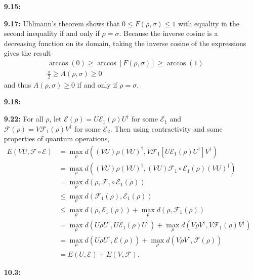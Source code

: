 \documentclass[a4paper,12pt]{article}
\begin{document}
\begin{enumerate}
    \item[\textbf{9.15:}]

    \item[\textbf{9.17:}]
        Uhlmann's theorem shows that $0 \leq F(\rho, \sigma) \leq 1$ with equality in the second inequality if and only if $\rho = \sigma$. Because the inverse cosine is a decreasing function on its domain, taking the inverse cosine of the expressions gives the result
        \begin{gather*}
            \arccos(0) \geq \arccos[F(\rho, \sigma)] \geq \arccos(1) \\
            \frac{\pi}{2} \geq A(\rho, \sigma) \geq 0
        \end{gather*}
        and thus $A(\rho, \sigma) \geq 0$ if and only if $\rho = \sigma$.


    \item[\textbf{9.18:}]

    \item[\textbf{9.22:}]
        For all $\rho$, let $\mathcal{E}(\rho) = U \mathcal{E}_1(\rho) U^\dagger$ for some $\mathcal{E}_1$ and $\mathcal{F}(\rho) = V \mathcal{F}_1(\rho) V^\dagger$ for some $\mathcal{E}_2$. Then using contractivity and some properties of quantum operations,
        \begin{align*}
            E(VU, \mathcal{F} \circ \mathcal{E}) &= \max_\rho d((VU) \rho (VU)^\dagger, V \mathcal{F}_1[U \mathcal{E}_1(\rho) U^\dagger]V^\dagger) \\
            &= \max_\rho d((VU) \rho (VU)^\dagger, (VU) \mathcal{F}_1 \circ \mathcal{E}_1(\rho) (VU)^\dagger) \\
            &= \max_\rho d(\rho, \mathcal{F}_1 \circ \mathcal{E}_1(\rho)) \\
            &\leq \max_\rho d(\mathcal{F}_1(\rho), \mathcal{E}_1(\rho)) \\
            &\leq \max_\rho d(\rho, \mathcal{E}_1(\rho)) + \max_\rho d(\rho, \mathcal{F}_1(\rho)) \\
            &= \max_\rho d(U \rho U^\dagger, U \mathcal{E}_1(\rho) U^\dagger) + \max_\rho d(V \rho V^\dagger, V \mathcal{F}_1(\rho) V^\dagger) \\
            &= \max_\rho d(U \rho U^\dagger, \mathcal{E}(\rho)) + \max_\rho d(V \rho V^\dagger, \mathcal{F}(\rho)) \\
            &= E(U, \mathcal{E}) + E(V, \mathcal{F}).
        \end{align*}


    \item[\textbf{10.3:}]


\end{enumerate}
\end{document}

